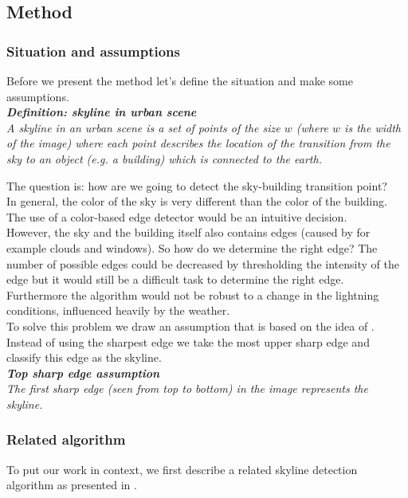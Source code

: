 \subsection{Method} %
\subsubsection{Situation and assumptions}
Before we present the method let's define the situation and make some
assumptions.\\

\textbf{\emph{Definition: skyline in urban scene}}\\
\emph{A skyline in an urban scene is a set of points of the size $w$ (where $w$ is the
width of the image) where each point describes the location of the
transition from the sky to an object (e.g. a building) which is connected to the
earth.}

The question is: how are we going to detect the sky-building
transition point?\\ 
In general, the color of the sky is very different than the
color of the building. The use of a color-based edge detector would be an
intuitive decision.\\
However, the sky and the building itself also contains edges (caused by for example
clouds and windows). So how do we determine the right edge?
The number of possible edges could be decreased by thresholding the intensity of
the edge but it would still be a difficult task to determine the right edge.
Furthermore the algorithm would not be robust to a change in
the lightning conditions, influenced heavily by the weather.\\

To solve this problem we draw an assumption that is based on the
idea of \cite{Rover}. Instead of using the sharpest edge we take the most upper sharp
edge and classify this edge as the skyline.\\

\textbf{\emph{Top sharp edge assumption}}\\
\emph{The first sharp edge (seen from top to bottom) in the image 
represents the skyline.}

\subsubsection{Related algorithm}
To put our work in context, we first describe a related skyline detection algorithm as presented in \cite{Rover}.\\

